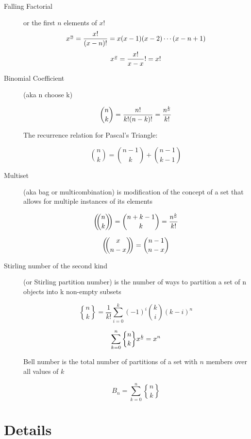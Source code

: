 \documentclass[]{article}
\newcommand{\fallingfactorial}[1]{%
  ^{\mspace{1mu}\underline{#1\mspace{-2mu}}\mspace{2mu}}%
}
\newcommand{\stirlingii}{\genfrac{\{}{\}}{0pt}{}}
\newcommand{\multichoose}[2]{\bigg(\!\!\dbinom{#1}{#2}\!\!\bigg)}
\begin{document}
\begin{description}

\item [Falling Factorial] or the first $n$ elements of $x!$ \\

$$x\fallingfactorial{n} = \frac{x!}{(x-n)!} = x(x-1)(x-2)\cdots(x-n+1)$$
$$x\fallingfactorial{x} = \frac{x!}{x-x}! = x!$$

\item [Binomial Coefficient] (aka n choose k)

$$\binom{n}{k} =  \frac{n!}{k!(n-k)!} = \frac{n\fallingfactorial{k}}{k!}$$

The recurrence relation for Pascal's Triangle:

$$\binom{n}{k} = \binom{n-1}{k} + \binom{n-1}{k-1}$$

\item [Multiset] (aka bag or multicombination) is modification of the concept of a set that allows for multiple instances of its elements

$$\multichoose{n}{k} = \binom{n+k-1}{k} = \frac{n\fallingfactorial{k}}{k!}$$

$$\multichoose{x}{n-x} = \binom{n-1}{n-x}$$

\item [Stirling number of the second kind] (or Stirling partition number) is the number of ways to partition a set of n objects into k non-empty subsets

$$\stirlingii{n}{k} = \frac{1}{k!}\sum_{i=0}^{k}{(-1)^i \binom{k}{i} (k-i)^n}$$

$$\sum_{k=0}^{n}{\stirlingii{n}{k} x\fallingfactorial{k}} = x^n$$

Bell number is the total number of partitions of a set with $n$ members over all values of $k$

$$B_n = \sum_{k=0}^{n} \stirlingii{n}{k}$$

\end{description}

\section*{Details}
\end{document}
